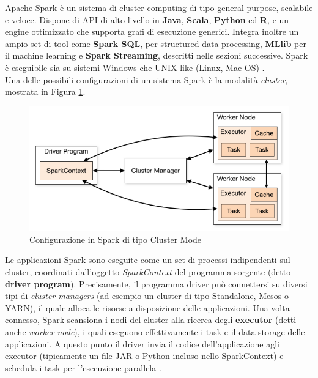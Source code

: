 \documentclass[11pt]{article}
\begin{document}
Apache Spark è un sistema di cluster computing di tipo general-purpose, scalabile e veloce. Dispone di API di alto livello in \textbf{Java}, \textbf{Scala},\textbf{ Python} ed \textbf{R}, e un engine ottimizzato che supporta grafi di esecuzione generici. Integra inoltre un ampio set di tool come \textbf{Spark SQL}, per structured data processing, \textbf{MLlib} per il machine learning e \textbf{Spark Streaming}, descritti nelle sezioni successive. Spark è eseguibile sia su sistemi Windows che UNIX-like (Linux, Mac OS) \cite{spark}. \\

Una delle possibili configurazioni di un sistema Spark è la modalità \textit{cluster}, mostrata in Figura \ref{spark-cluster}. 

\begin{figure}[H]
	\centering
	\includegraphics[scale=0.50]{images/cluster-overview.png}
	\caption{Configurazione in Spark di tipo Cluster Mode \cite{spark}}
	\label{spark-cluster}
\end{figure}

Le applicazioni Spark sono eseguite come un set di processi indipendenti sul cluster, coordinati dall'oggetto \textit{SparkContext} del programma sorgente (detto \textbf{driver program}). Precisamente, il programma driver può connettersi su diversi tipi di \textit{cluster managers} (ad esempio un cluster di tipo Standalone, Mesos o YARN), il quale alloca le risorse a disposizione delle applicazioni. Una volta connesso, Spark scansiona i nodi del cluster alla ricerca degli \textbf{executor} (detti anche \textit{worker node}), i quali eseguono effettivamente i task e il data storage delle applicazioni. A questo punto il driver invia il codice dell'applicazione agli executor (tipicamente un file JAR o Python incluso nello SparkContext) e schedula i task per l'esecuzione parallela \cite{spark}. 
\end{document}
